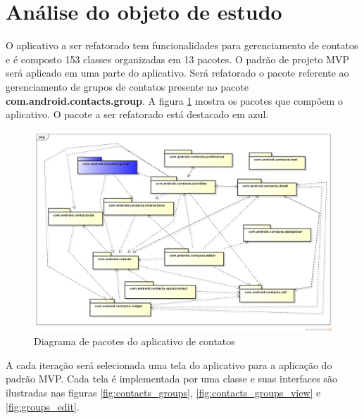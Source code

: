 \section{Análise do objeto de estudo}

O aplicativo a ser refatorado tem funcionalidades para gerenciamento de
contatos e é composto 153 classes organizadas em 13 pacotes. O padrão
de projeto MVP será aplicado em uma parte do aplicativo. Será refatorado o
pacote referente ao gerenciamento de grupos de contatos presente no pacote
\textbf{com.android.contacts.group}. A figura \ref{fig:pacotes_contacts}
mostra os pacotes que compõem o aplicativo. O pacote a ser refatorado está
destacado em azul.

\begin{figure}[!h]
	\centering
	\includegraphics[scale=0.40,angle=90]{img/pacotes_contacts.png}
	\caption{Diagrama de pacotes do aplicativo de contatos} 
	\label{fig:pacotes_contacts}
\end{figure}


A cada iteração será selecionada uma tela do aplicativo para a aplicação do
padrão MVP. Cada tela é implementada por uma classe e suas interfaces
são ilustradas nas figuras \ref{fig:contacts_groups},
\ref{fig:contacts_groups_view} e \ref{fig:groups_edit}. 

